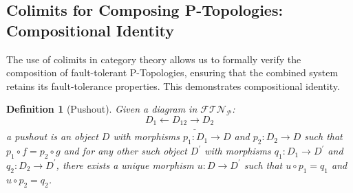 \documentclass[10pt]{article}
\newtheorem{definition}[theorem]{Definition
}
\begin{document}
\subsection{Colimits for Composing P-Topologies: Compositional Identity}
The use of colimits in category theory allows us to formally verify the composition of fault-tolerant P-Topologies, ensuring that the combined system retains its fault-tolerance properties. This demonstrates compositional identity.

\begin{definition}[Pushout]
Given a diagram in $\mathcal{FTN}_{\mathcal{P}}$:
$$D_{1}\leftarrow D_{12}\underline{\rightarrow}D_{2}$$
a pushout is an object $D$ with morphisms $p_{1}:D_{1}\rightarrow D$ and $p_{2}:D_{2}\rightarrow D$ such that $p_{1}\circ f=p_{2}\circ g$ and for any other such object $D^{\prime}$ with morphisms $q_{1}:D_{1}\rightarrow D^{\prime}$ and $q_{2}:D_{2}\rightarrow D^{\prime}$, there exists a unique morphism $u:D\rightarrow D^{\prime}$ such that $u\circ p_{1}=q_{1}$ and $u\circ p_{2}=q_{2}$.
\end{definition}
\end{document}
